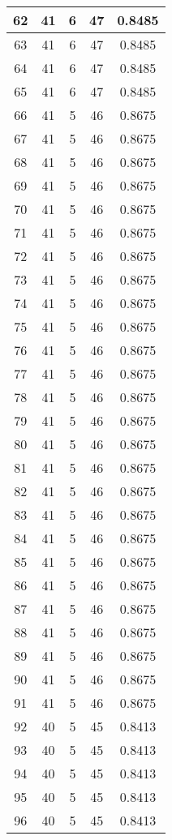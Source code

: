 \documentclass[letterpaper, 12pt]{article}
\begin{document}
\begin{longtable}{|c|c|c|c|c|}
\hline
62 & 41 & 6 & 47 & 0.8485 \\
\hline
63 & 41 & 6 & 47 & 0.8485 \\
\hline
64 & 41 & 6 & 47 & 0.8485 \\
\hline
65 & 41 & 6 & 47 & 0.8485 \\
\hline
66 & 41 & 5 & 46 & 0.8675 \\
\hline
67 & 41 & 5 & 46 & 0.8675 \\
\hline
68 & 41 & 5 & 46 & 0.8675 \\
\hline
69 & 41 & 5 & 46 & 0.8675 \\
\hline
70 & 41 & 5 & 46 & 0.8675 \\
\hline
71 & 41 & 5 & 46 & 0.8675 \\
\hline
72 & 41 & 5 & 46 & 0.8675 \\
\hline
73 & 41 & 5 & 46 & 0.8675 \\
\hline
74 & 41 & 5 & 46 & 0.8675 \\
\hline
75 & 41 & 5 & 46 & 0.8675 \\
\hline
76 & 41 & 5 & 46 & 0.8675 \\
\hline
77 & 41 & 5 & 46 & 0.8675 \\
\hline
78 & 41 & 5 & 46 & 0.8675 \\
\hline
79 & 41 & 5 & 46 & 0.8675 \\
\hline
80 & 41 & 5 & 46 & 0.8675 \\
\hline
81 & 41 & 5 & 46 & 0.8675 \\
\hline
82 & 41 & 5 & 46 & 0.8675 \\
\hline
83 & 41 & 5 & 46 & 0.8675 \\
\hline
84 & 41 & 5 & 46 & 0.8675 \\
\hline
85 & 41 & 5 & 46 & 0.8675 \\
\hline
86 & 41 & 5 & 46 & 0.8675 \\
\hline
87 & 41 & 5 & 46 & 0.8675 \\
\hline
88 & 41 & 5 & 46 & 0.8675 \\
\hline
89 & 41 & 5 & 46 & 0.8675 \\
\hline
90 & 41 & 5 & 46 & 0.8675 \\
\hline
91 & 41 & 5 & 46 & 0.8675 \\
\hline
92 & 40 & 5 & 45 & 0.8413 \\
\hline
93 & 40 & 5 & 45 & 0.8413 \\
\hline
94 & 40 & 5 & 45 & 0.8413 \\
\hline
95 & 40 & 5 & 45 & 0.8413 \\
\hline
96 & 40 & 5 & 45 & 0.8413 \\

\end{longtable}
\end{document}
